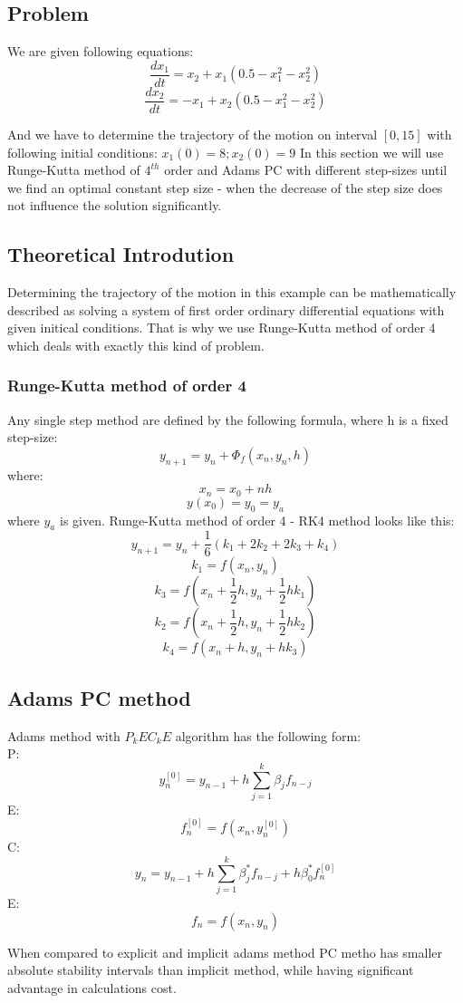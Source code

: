 \documentclass[12pt]{report}
\begin{document}
\subsection{Problem}
We are given following equations:
\[ \frac{dx_1}{dt} = x_2 + x_1(0.5 - x_1^2 - x_2^2) \]
\[ \frac{dx_2}{dt} = -x_1 + x_2(0.5 - x_1^2 - x_2^2) \]

And we have to determine the trajectory of the motion on interval $[0, 15]$ with following initial conditions:
$ x_1(0) = 8; x_2(0) = 9 $
In this section we will use Runge-Kutta method of $4^{th}$ order and Adams PC with different step-sizes until we find an optimal constant step size - when the decrease of the step size does not influence the solution significantly.

\subsection{Theoretical Introdution}
Determining the trajectory of the motion in this example can be mathematically described as solving a system of first order ordinary differential equations with given initical conditions. That is why we use Runge-Kutta method of order 4 which deals with exactly this kind of problem.
\subsubsection{Runge-Kutta method of order 4}
Any single step method are defined by the following formula, where h is a fixed step-size:
\[ y_{n+1} = y_n + \Phi_f(x_n, y_n, h) \]
where:
\[ x_n = x_0 + nh \]
\[ y(x_0) = y_0 = y_a \]
where $y_a$ is given.
Runge-Kutta method of order 4 - RK4 method looks like this:
\[ y_{n+1} = y_n + \frac{1}{6}(k_1 + 2k_2+2k_3+k_4) \]
\[ k_1 = f(x_n, y_n) \]
\[ k_3 = f(x_n + \frac{1}{2}h, y_n + \frac{1}{2}hk_1) \]
\[ k_2 = f(x_n + \frac{1}{2}h, y_n + \frac{1}{2}hk_2) \]
\[ k_4 = f(x_n + h, y_n + hk_3) \]


\subsection{Adams PC method}
Adams method with $P_kEC_kE$ algorithm has the following form: \\
P: \[  y_n^{[0]} = y_{n-1} + h\sum_{j=1}^k \beta_jf_{n-j} \]
E: \[  f_n^{[0]} = f(x_n, y_n^{[0]}) \]
C: \[  y_n = y_{n-1} + h \sum_{j=1}^k \beta_j^* f_{n-j} + h \beta_0^* f_n^{[0]}\]
E: \[  f_n = f(x_n, y_n) \]

When compared to explicit and implicit adams method PC metho has smaller absolute stability intervals than implicit method, while having significant advantage in calculations cost.
\end{document}

